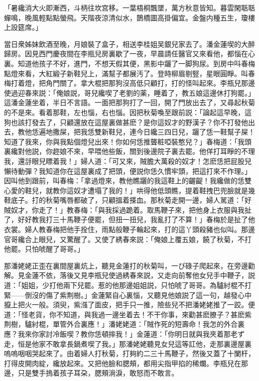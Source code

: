 \begin{myquote}
「暑纔消大火即漸西，斗柄往坎宫移。一葉梧桐飄墜，萬方秋意皆知。暮雲閑聒聒蟬鳴，晚風輕點點螢飛。天階夜涼清似水，鵲橋圖高掛偏宜。金盤内種五生，瓊樓上設筵席。」
\end{myquote}

當日衆姊妹飲酒至晚，月娘裝了盒子，相送李桂姐吴銀兒家去了。潘金蓮喫的大醉歸房。因見西門慶夜間在李瓶兒房裏歇了一夜，早晨請任醫官又來看他，都惱在心裏。知道他孩子不好，進門，不想天假其便，黑影中躧了一脚狗尿。到房中呌春梅點燈來看，大紅緞子新鞋兒上，滿幫子都展汚了。登時柳眉剔竪，星眼圓睜。叫春梅打着燈，把角門關了。拿大棍把那狗沒高低只顧打，打的怪叫起來。李瓶兒那邊使過迎春來説：「俺娘説，哥兒纔喫了老劉的薬，睡着了，教五娘這邊休打狗罷。」這潘金蓮坐着，半日不言語。一面把那狗打了一回，開了門放出去了，又尋起秋菊的不是來。看着那鞋，左也惱，右也惱。因把秋菊喚至跟前説：「論起這早晚，這狗也該打發去了，只顧還放在這屋裏做甚麽？是你這奴才的野漢子？你不打發他出去，教他恁遍地撒屎，把我恁雙新鞋兒，連今日纔三四日兒，躧了恁一鞋幫子屎！知道了我來，你與我點個燈兒出來！你如何恁推聾粧啞裝憨兒？」春梅道：「我頭裏纔對他説，你趂娘不來，早喂他些飯，關到後邊院子裏去罷。他佯打耳睜的不理我，還㧱眼兒瞟着我！」婦人道：「可又來，賊膽大萬殺的奴才！怎麽恁把屁股兒懶待動彈？我知道你在這屋裏成了把頭，便説你恁久慣牢頭，把這打來不作理。」因叫他到跟前，叫春梅：「拿過燈來，教他瞧躧的我這鞋上的齷齪！我纔做的恁雙心愛的鞋兒，就教你這奴才遭塌了我的！」哄得他低頭瞧，提着鞋拽巴兜臉就是幾鞋底子。打的秋菊嘴唇都破了，只顧搵着搽血。那秋菊走開一邊，婦人駡道：「好賊奴才，你走了！」教春梅：「與我採過跪着。取馬鞭子來，把他身上衣服與我扯了，好好教我打三十馬鞭子便罷，但扭一扭兒，我亂打了不算！」春梅於是扯了他衣裳。婦人教春梅把他手拴住，雨點般鞭子輪起來，打的這丫頭殺豬也似叫。那邊官哥纔合上眼兒，又驚醒了。又使了綉春來説：「俺娘上覆五娘，饒了秋菊，不打他罷。只怕唬醒了哥哥。」

那潘姥姥正歪在裏間屋裏炕上，聽見金蓮打的秋菊叫，一ぴ碌子爬起來，在旁邊勸解。見金蓮不依，落後又見李瓶兒使過綉春來説，又走向前奪他女兒手中鞭子，説道：「姐姐，少打他兩下兒罷。惹的他那邊姐姐説，只怕唬了哥哥。為驢紂棍不打緊——倒沒的傷了紫荆樹。」金蓮緊自心裏惱，又聽見他娘説了這一句，越發心中攛上把火一般。須臾，紫漒了面皮，把手只一推，險些兒不把潘姥姥推了一跤。便道：「怪老貨，你不知道，與我過一邊坐着去！不干你事，來勸甚麽膫子？甚麽紫荆樹，驢紂棍，單管外合裏應！」潘姥姥道：「賊作死的短壽命！我怎的外合裏應？我來你家討冷飯喫？教你恁頓摔我！」金蓮道：「你明日就與我夾着那老ず走，恒是他家不敢拿長鍋煮喫了我。」那潘姥姥聽見女兒這等訌他，走那裏邊屋裏嗚嗚咽咽哭起來了。由着婦人打秋菊，打夠約二三十馬鞭子，然後又蓋了十闌杆，打得皮開肉綻，纔放起來。又把他臉和腮頰，都用尖指甲掐的稀爛。李瓶兒在那邊，只是雙手摀着孩子耳朶，腮頰淌淚，敢怒而不敢言。

